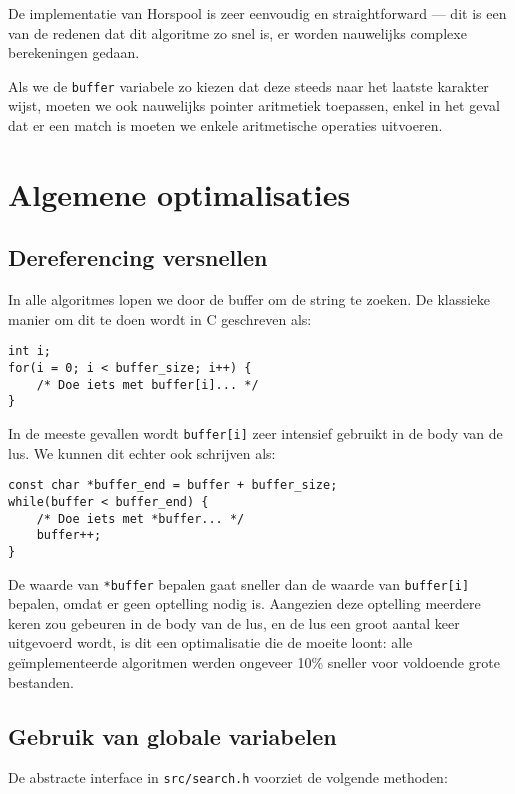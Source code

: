 \documentclass[a4paper,11pt]{article}
\begin{document}
De implementatie van Horspool is zeer eenvoudig en straightforward — dit is een
van de redenen dat dit algoritme zo snel is, er worden nauwelijks complexe
berekeningen gedaan.

Als we de \verb#buffer# variabele zo kiezen dat deze steeds naar het laatste
karakter wijst, moeten we ook nauwelijks pointer aritmetiek toepassen, enkel in
het geval dat er een match is moeten we enkele aritmetische operaties uitvoeren.

\section{Algemene optimalisaties}

\subsection{Dereferencing versnellen}

In alle algoritmes lopen we door de buffer om de string te zoeken. De klassieke
manier om dit te doen wordt in C geschreven als:

\begin{verbatim}
int i;
for(i = 0; i < buffer_size; i++) {
    /* Doe iets met buffer[i]... */
}
\end{verbatim}

In de meeste gevallen wordt \verb#buffer[i]# zeer intensief gebruikt in de body
van de lus. We kunnen dit echter ook schrijven als:

\begin{verbatim}
const char *buffer_end = buffer + buffer_size;
while(buffer < buffer_end) {
    /* Doe iets met *buffer... */
    buffer++;
}
\end{verbatim}

De waarde van \verb#*buffer# bepalen gaat sneller dan de waarde van
\verb#buffer[i]# bepalen, omdat er geen optelling nodig is. Aangezien deze
optelling meerdere keren zou gebeuren in de body van de lus, en de lus een groot
aantal keer uitgevoerd wordt, is dit een optimalisatie die de moeite loont: alle
ge\"implementeerde algoritmen werden ongeveer 10\% sneller voor voldoende grote
bestanden.

\subsection{Gebruik van globale variabelen}

De abstracte interface in \verb#src/search.h# voorziet de volgende methoden:
\end{document}

